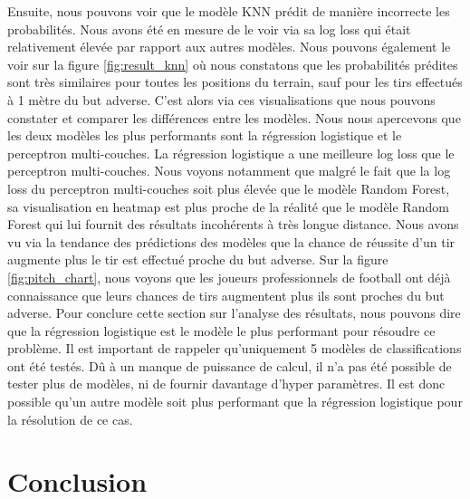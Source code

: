 \documentclass[12pt]{article}
\begin{document}
\newline\newline
Ensuite, nous pouvons voir que le modèle KNN prédit de manière incorrecte les probabilités.
Nous avons été en mesure de le voir via sa log loss qui était relativement élevée par rapport aux autres modèles.
Nous pouvons également le voir sur la figure \ref{fig:result_knn} où nous constatons que les probabilités prédites sont très similaires pour toutes les positions du terrain, sauf pour les tirs effectués à 1 mètre du but adverse.
\newline\newline
C'est alors via ces visualisations que nous pouvons constater et comparer les différences entre les modèles.
Nous nous apercevons que les deux modèles les plus performants sont la régression logistique et le perceptron multi-couches.
La régression logistique a une meilleure log loss que le perceptron multi-couches.
Nous voyons notamment que malgré le fait que la log loss du perceptron multi-couches soit plus élevée que le modèle Random Forest, sa visualisation en heatmap est plus proche de la réalité que le modèle Random Forest qui lui fournit des résultats incohérents à très longue distance.
Nous avons vu via la tendance des prédictions des modèles que la chance de réussite d'un tir augmente plus le tir est effectué proche du but adverse.
Sur la figure \ref{fig:pitch_chart}, nous voyons que les joueurs professionnels de football ont déjà connaissance que leurs chances de tirs augmentent plus ils sont proches du but adverse.
\newline\newline
Pour conclure cette section sur l'analyse des résultats, nous pouvons dire que la régression logistique est le modèle le plus performant pour résoudre ce problème. 
Il est important de rappeler qu'uniquement 5 modèles de classifications ont été testés.
Dû à un manque de puissance de calcul, il n'a pas été possible de tester plus de modèles, ni de fournir davantage d'hyper paramètres.
Il est donc possible qu'un autre modèle soit plus performant que la régression logistique pour la résolution de ce cas.
\newpage
\section{Conclusion}
\end{document}
